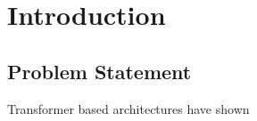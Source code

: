 \section{Introduction}
\label{sec:intro}

\subsection{Problem Statement}

Transformer based architectures have shown